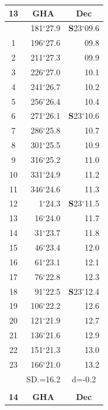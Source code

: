 \documentclass[10pt, a4paper]{report}
\begin{document}
\begin{scriptsize}
\noindent
\begin{tabular*}{0.2\textwidth}[t]{@{\extracolsep{\fill}}|c|rr|}
\hline
\multicolumn{1}{|c|}{\rule{0pt}{2.6ex}\textbf{13}} & \multicolumn{1}{c}{\textbf{GHA}} & \multicolumn{1}{c|}{\textbf{Dec}}\\
\hline\rule{0pt}{2.6ex}\noindent
0 & 181$^\circ$27.9 & \textbf{S}23$^\circ$09.6\\
1 & 196$^\circ$27.6 & 09.8\\
2 & 211$^\circ$27.3 & 09.9\\
3 & 226$^\circ$27.0 & \raisebox{0.24ex}{\boldmath$\cdot$~\boldmath$\cdot$~~}10.1\\
4 & 241$^\circ$26.7 & 10.2\\
5 & 256$^\circ$26.4 & 10.4\\[2Pt]
6 & 271$^\circ$26.1 & \textbf{S}23$^\circ$10.6\\
7 & 286$^\circ$25.8 & 10.7\\
8 & 301$^\circ$25.5 & 10.9\\
9 & 316$^\circ$25.2 & \raisebox{0.24ex}{\boldmath$\cdot$~\boldmath$\cdot$~~}11.0\\
10 & 331$^\circ$24.9 & 11.2\\
11 & 346$^\circ$24.6 & 11.3\\[2Pt]
12 & 1$^\circ$24.3 & \textbf{S}23$^\circ$11.5\\
13 & 16$^\circ$24.0 & 11.7\\
14 & 31$^\circ$23.7 & 11.8\\
15 & 46$^\circ$23.4 & \raisebox{0.24ex}{\boldmath$\cdot$~\boldmath$\cdot$~~}12.0\\
16 & 61$^\circ$23.1 & 12.1\\
17 & 76$^\circ$22.8 & 12.3\\[2Pt]
18 & 91$^\circ$22.5 & \textbf{S}23$^\circ$12.4\\
19 & 106$^\circ$22.2 & 12.6\\
20 & 121$^\circ$21.9 & 12.7\\
21 & 136$^\circ$21.6 & \raisebox{0.24ex}{\boldmath$\cdot$~\boldmath$\cdot$~~}12.9\\
22 & 151$^\circ$21.3 & 13.0\\
23 & 166$^\circ$21.0 & 13.2\\
\hline
\rule{0pt}{2.4ex} & \multicolumn{1}{c}{SD.=16.2} & \multicolumn{1}{c|}{d=-0.2}\\
\hline
\multicolumn{1}{c}{}\\[-0.5ex]\hline
\multicolumn{1}{|c|}{\rule{0pt}{2.6ex}\textbf{14}} & \multicolumn{1}{c}{\textbf{GHA}} & \multicolumn{1}{c|}{\textbf{Dec}}\\

\end{tabular*}
\end{scriptsize}
\end{document}
